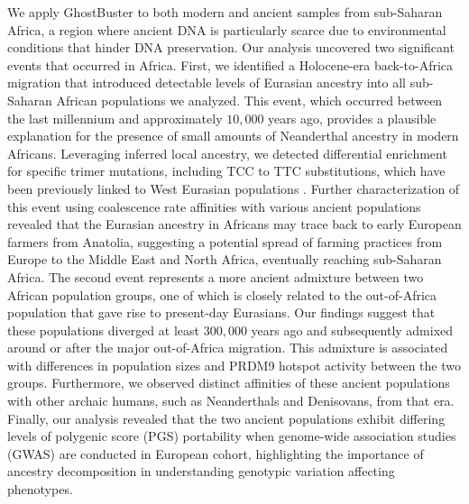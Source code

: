 We apply GhostBuster to both modern and ancient samples from sub-Saharan Africa, a region where ancient DNA is particularly scarce due to environmental conditions that hinder DNA preservation. Our analysis uncovered two significant events that occurred in Africa. First, we identified a Holocene-era back-to-Africa migration that introduced detectable levels of Eurasian ancestry into all sub-Saharan African populations we analyzed. This event, which occurred between the last millennium and approximately $10{,}000$ years ago, provides a plausible explanation for the presence of small amounts of Neanderthal ancestry in modern Africans. Leveraging inferred local ancestry, we detected differential enrichment for specific trimer mutations, including TCC to TTC substitutions, which have been previously linked to West Eurasian populations \cite{harris2015evidence}. Further characterization of this event using coalescence rate affinities with various ancient populations revealed that the Eurasian ancestry in Africans may trace back to early European farmers from Anatolia, suggesting a potential spread of farming practices from Europe to the Middle East and North Africa, eventually reaching sub-Saharan Africa. The second event represents a more ancient admixture between two African population groups, one of which is closely related to the out-of-Africa population that gave rise to present-day Eurasians. Our findings suggest that these populations diverged at least $300{,}000$ years ago and subsequently admixed around or after the major out-of-Africa migration. This admixture is associated with differences in population sizes and PRDM9 hotspot activity between the two groups. Furthermore, we observed distinct affinities of these ancient populations with other archaic humans, such as Neanderthals and Denisovans, from that era. Finally, our analysis revealed that the two ancient populations exhibit differing levels of polygenic score (PGS) portability when genome-wide association studies (GWAS) are conducted in European cohort, highlighting the importance of ancestry decomposition in understanding genotypic variation affecting phenotypes.








